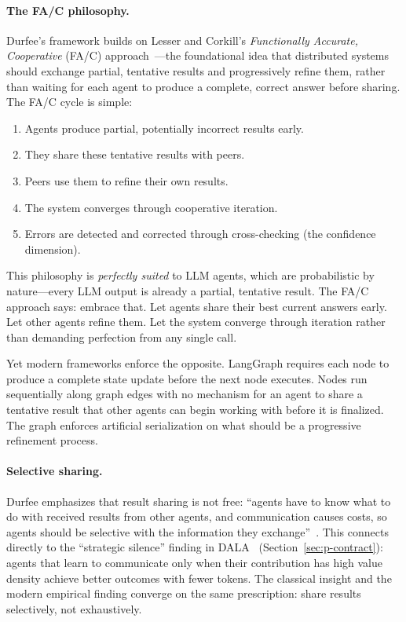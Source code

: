 \documentclass{article}
\begin{document}
\paragraph{The FA/C philosophy.}
Durfee's framework builds on Lesser and Corkill's \emph{Functionally Accurate,
Cooperative} (FA/C) approach~\citep{lesser1983functionally}---the foundational idea that
distributed systems should exchange partial, tentative results and progressively refine
them, rather than waiting for each agent to produce a complete, correct answer before
sharing. The FA/C cycle is simple:
\begin{enumerate}[nosep, label=(\roman*)]
  \item Agents produce partial, potentially incorrect results early.
  \item They share these tentative results with peers.
  \item Peers use them to refine their own results.
  \item The system converges through cooperative iteration.
  \item Errors are detected and corrected through cross-checking (the confidence
    dimension).
\end{enumerate}

\noindent
This philosophy is \emph{perfectly suited} to LLM agents, which are probabilistic by
nature---every LLM output is already a partial, tentative result. The FA/C approach
says: embrace that. Let agents share their best current answers early. Let other agents
refine them. Let the system converge through iteration rather than demanding perfection
from any single call.

Yet modern frameworks enforce the opposite. LangGraph requires each node to produce
a complete state update before the next node executes. Nodes run sequentially along
graph edges with no mechanism for an agent to share a tentative result that other
agents can begin working with before it is finalized. The graph enforces artificial
serialization on what should be a progressive refinement process.

\paragraph{Selective sharing.}
Durfee emphasizes that result sharing is not free: ``agents have to know what to do
with received results from other agents, and communication causes costs, so agents
should be selective with the information they
exchange''~\citep{durfee1999distributed}. This connects directly to the ``strategic
silence'' finding in DALA~\citep{dala2025} (Section~\ref{sec:p-contract}): agents that
learn to communicate only when their contribution has high value density achieve better
outcomes with fewer tokens. The classical insight and the modern empirical finding
converge on the same prescription: share results selectively, not exhaustively.
\end{document}
